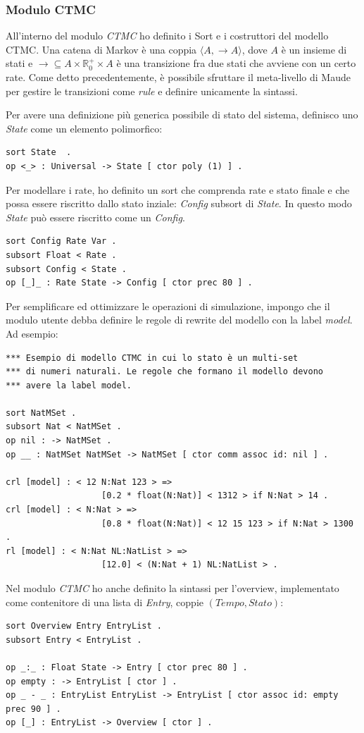 \subsubsection{Modulo CTMC}

All'interno del modulo \emph{CTMC} ho definito i Sort e i costruttori del
modello CTMC. Una catena di Markov è una coppia $\langle A , \rightarrow A
\rangle$, dove $A$ è un insieme di stati e $\rightarrow \subseteq A \times
\mathbb{R}_{0}^{+} \times A$ è una transizione fra due stati che avviene con un
certo rate. Come detto precedentemente, è possibile sfruttare il meta-livello di
Maude per gestire le transizioni come \emph{rule} e definire unicamente la sintassi.

Per avere una definizione più generica possibile di stato del sistema, definisco
uno \emph{State} come un elemento polimorfico:
\begin{Verbatim}[fontsize=\small]
sort State  .
op <_> : Universal -> State [ ctor poly (1) ] .
\end{Verbatim}

Per modellare i rate, ho definito un sort che comprenda rate e stato finale e
che possa essere riscritto dallo stato inziale: \emph{Config} subsort di
\emph{State}. In questo modo \emph{State} può essere riscritto come un
\emph{Config}.
\begin{Verbatim}[fontsize=\small]
sort Config Rate Var .
subsort Float < Rate .
subsort Config < State .
op [_]_ : Rate State -> Config [ ctor prec 80 ] .
\end{Verbatim}
Per semplificare ed ottimizzare le operazioni di simulazione, impongo che il
modulo utente debba definire le regole di rewrite del modello con la
label \emph{model}. Ad esempio:
\begin{Verbatim}[fontsize=\small]
*** Esempio di modello CTMC in cui lo stato è un multi-set
*** di numeri naturali. Le regole che formano il modello devono
*** avere la label model.

sort NatMSet .
subsort Nat < NatMSet .
op nil : -> NatMSet .
op __ : NatMSet NatMSet -> NatMSet [ ctor comm assoc id: nil ] .

crl [model] : < 12 N:Nat 123 > =>
                   [0.2 * float(N:Nat)] < 1312 > if N:Nat > 14 .
crl [model] : < N:Nat > =>
                   [0.8 * float(N:Nat)] < 12 15 123 > if N:Nat > 1300 .
rl [model] : < N:Nat NL:NatList > =>
                   [12.0] < (N:Nat + 1) NL:NatList > .
\end{Verbatim} 

Nel modulo \emph{CTMC} ho anche definito la sintassi per l'overview,
implementato come contenitore di una lista di \emph{Entry}, coppie
$(Tempo, Stato)$:
\begin{Verbatim}[fontsize=\small]
sort Overview Entry EntryList .
subsort Entry < EntryList .

op _:_ : Float State -> Entry [ ctor prec 80 ] .
op empty : -> EntryList [ ctor ] .
op _ - _ : EntryList EntryList -> EntryList [ ctor assoc id: empty prec 90 ] .
op [_] : EntryList -> Overview [ ctor ] .
\end{Verbatim}

